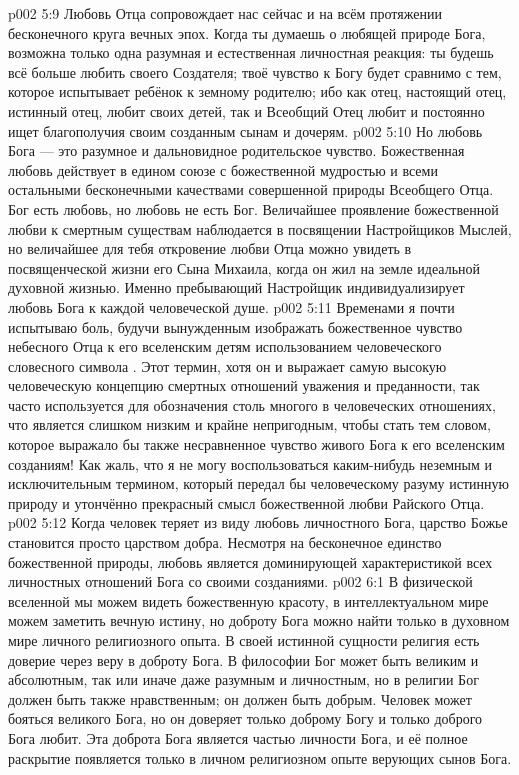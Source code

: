 \vs p002 5:9 Любовь Отца сопровождает нас сейчас и на всём протяжении бесконечного круга вечных эпох. Когда ты думаешь о любящей природе Бога, возможна только одна разумная и естественная личностная реакция: ты будешь всё больше любить своего Создателя; твоё чувство к Богу будет сравнимо с тем, которое испытывает ребёнок к земному родителю; ибо как отец, настоящий отец, истинный отец, любит своих детей, так и Всеобщий Отец любит и постоянно ищет благополучия своим созданным сынам и дочерям.
\vs p002 5:10 Но любовь Бога --- это разумное и дальновидное родительское чувство. Божественная любовь действует в едином союзе с божественной мудростью и всеми остальными бесконечными качествами совершенной природы Всеобщего Отца. Бог есть любовь, но любовь не есть Бог. Величайшее проявление божественной любви к смертным существам наблюдается в посвящении Настройщиков Мыслей, но величайшее для тебя откровение любви Отца можно увидеть в посвященческой жизни его Сына Михаила, когда он жил на земле идеальной духовной жизнью. Именно пребывающий Настройщик индивидуализирует любовь Бога к каждой человеческой душе.
\vs p002 5:11 \pc Временами я почти испытываю боль, будучи вынужденным изображать божественное чувство небесного Отца к его вселенским детям использованием человеческого словесного символа . Этот термин, хотя он и выражает самую высокую человеческую концепцию смертных отношений уважения и преданности, так часто используется для обозначения столь многого в человеческих отношениях, что является слишком низким и крайне непригодным, чтобы стать тем словом, которое выражало бы также несравненное чувство живого Бога к его вселенским созданиям! Как жаль, что я не могу воспользоваться каким\hyp{}нибудь неземным и исключительным термином, который передал бы человеческому разуму истинную природу и утончённо прекрасный смысл божественной любви Райского Отца.
\vs p002 5:12 \pc Когда человек теряет из виду любовь личностного Бога, царство Божье становится просто царством добра. Несмотря на бесконечное единство божественной природы, любовь является доминирующей характеристикой всех личностных отношений Бога со своими созданиями.
\vs p002 6:1 В физической вселенной мы можем видеть божественную красоту, в интеллектуальном мире можем заметить вечную истину, но доброту Бога можно найти только в духовном мире личного религиозного опыта. В своей истинной сущности религия есть доверие через веру в доброту Бога. В философии Бог может быть великим и абсолютным, так или иначе даже разумным и личностным, но в религии Бог должен быть также нравственным; он должен быть добрым. Человек может бояться великого Бога, но он доверяет только доброму Богу и только доброго Бога любит. Эта доброта Бога является частью личности Бога, и её полное раскрытие появляется только в личном религиозном опыте верующих сынов Бога.
